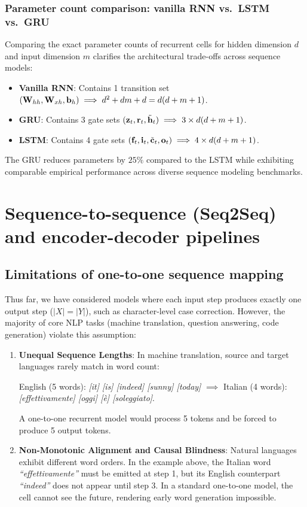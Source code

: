 \documentclass[../../main.tex]{subfiles}
\begin{document}
\subsubsection{Parameter count comparison: vanilla RNN vs.~LSTM vs.~GRU}
Comparing the exact parameter counts of recurrent cells for hidden dimension $d$ and input dimension $m$ clarifies the architectural trade-offs across sequence models:
\begin{itemize}
    \item \textbf{Vanilla RNN}: Contains 1 transition set $(\mathbf{W}_{hh}, \mathbf{W}_{xh}, \mathbf{b}_h) \implies d^2 + dm + d = d(d + m + 1)$.
    \item \textbf{GRU}: Contains 3 gate sets $(\mathbf{z}_t, \mathbf{r}_t, \tilde{\mathbf{h}}_t) \implies 3 \times d(d + m + 1)$.
    \item \textbf{LSTM}: Contains 4 gate sets $(\mathbf{f}_t, \mathbf{i}_t, \tilde{\mathbf{c}}_t, \mathbf{o}_t) \implies 4 \times d(d + m + 1)$.
\end{itemize}
The GRU reduces parameters by $25\%$ compared to the LSTM while exhibiting comparable empirical performance across diverse sequence modeling benchmarks.

\clearpage
\section{Sequence-to-sequence (Seq2Seq) and encoder-decoder pipelines}
\label{sec:seq2seq}

\subsection{Limitations of one-to-one sequence mapping}
Thus far, we have considered models where each input step produces exactly one output step ($|X| = |Y|$), such as character-level case correction. However, the majority of core NLP tasks (machine translation, question answering, code generation) violate this assumption:
\begin{enumerate}
    \item \textbf{Unequal Sequence Lengths}: In machine translation, source and target languages rarely match in word count:
    \begin{center}
    English (5 words): \textit{[it] [is] [indeed] [sunny] [today]} $\implies$ Italian (4 words): \textit{[effettivamente] [oggi] [\`e] [soleggiato]}.
    \end{center}
    A one-to-one recurrent model would process 5 tokens and be forced to produce 5 output tokens.
    \item \textbf{Non-Monotonic Alignment and Causal Blindness}: Natural languages exhibit different word orders. In the example above, the Italian word \textit{``effettivamente''} must be emitted at step 1, but its English counterpart \textit{``indeed''} does not appear until step 3. In a standard one-to-one model, the cell cannot see the future, rendering early word generation impossible.
\end{enumerate}
\end{document}
